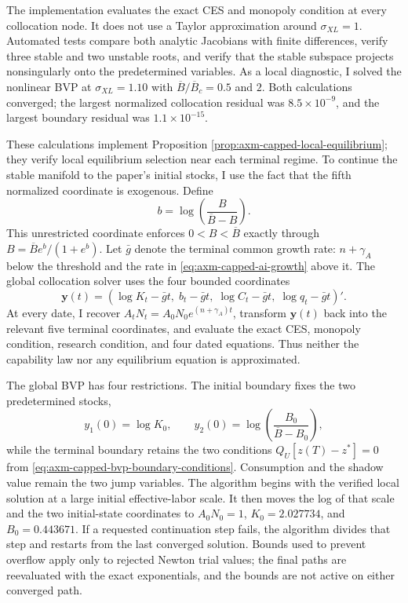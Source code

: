 The implementation evaluates the exact CES and monopoly condition at every
collocation node. It does not use a Taylor approximation around
\(\sigma_{XL}=1\). Automated tests compare both analytic Jacobians with finite
differences, verify three stable and two unstable roots, and verify that the
stable subspace projects nonsingularly onto the predetermined variables. As a
local diagnostic, I solved the nonlinear BVP at \(\sigma_{XL}=1.10\) with
\(\overline B/\overline B_c=0.5\) and \(2\). Both calculations converged; the
largest normalized collocation residual was \(8.5\times10^{-9}\), and the
largest boundary residual was \(1.1\times10^{-15}\).

These calculations implement Proposition
\ref{prop:axm-capped-local-equilibrium}; they verify local equilibrium
selection near each terminal regime. To continue the stable manifold to the
paper's initial stocks, I use the fact that the fifth normalized coordinate is
exogenous. Define
\begin{equation}
 b=\log\left(\frac{B}{\overline B-B}\right).
 \label{eq:axm-capped-capability-logit}
\end{equation}
This unrestricted coordinate enforces \(0<B<\overline B\) exactly through
\(B=\overline B e^b/(1+e^b)\). Let \(\bar g\) denote the terminal common growth
rate: \(n+\gamma_A\) below the threshold and the rate in
\eqref{eq:axm-capped-ai-growth} above it. The global collocation solver uses
the four bounded coordinates
\begin{equation}
 \mathbf y(t)=
 \left(\log K_t-\bar g t,\;
 b_t-\bar g t,\;
 \log C_t-\bar g t,\;
 \log q_t-\bar g t\right)'.
 \label{eq:axm-capped-global-coordinates}
\end{equation}
At every date, I recover
\(A_tN_t=A_0N_0e^{(n+\gamma_A)t}\), transform
\(\mathbf y(t)\) back into the relevant five terminal coordinates, and
evaluate the exact CES, monopoly condition, research condition, and four dated
equations. Thus neither the capability law nor any equilibrium equation is
approximated.

The global BVP has four restrictions. The initial boundary fixes the two
predetermined stocks,
\begin{equation}
 y_1(0)=\log K_0,\qquad
 y_2(0)=\log\left(\frac{B_0}{\overline B-B_0}\right),
 \label{eq:axm-capped-global-initial-boundary}
\end{equation}
while the terminal boundary retains the two conditions
\(Q_U[z(T)-z^*]=0\) from
\eqref{eq:axm-capped-bvp-boundary-conditions}. Consumption and the shadow
value remain the two jump variables. The algorithm begins with the verified
local solution at a large initial effective-labor scale. It then moves the log
of that scale and the two initial-state coordinates to
\(A_0N_0=1\), \(K_0=2.027734\), and \(B_0=0.443671\). If a requested
continuation step fails, the algorithm divides that step and restarts from the
last converged solution. Bounds used to prevent overflow apply only to rejected
Newton trial values; the final paths are reevaluated with the exact
exponentials, and the bounds are not active on either converged path.

